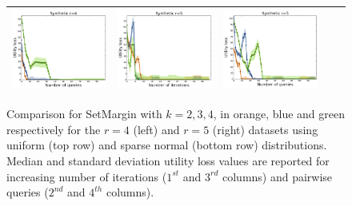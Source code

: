 \documentclass{article}
\renewcommand\[{\begin{equation}}
\renewcommand\]{\end{equation}}
\begin{document}
\begin{figure}[t]
{\begin{tabular}{ccccc}
        \includegraphics[align=c,width=10em]{figures/synthetic_vs_self_4_normal_sparse_per_query_loss} &
        \includegraphics[align=c,width=10em]{figures/synthetic_vs_self_5_normal_sparse_per_iter_loss} &
        \includegraphics[align=c,width=10em]{figures/synthetic_vs_self_5_normal_sparse_per_query_loss}
        \\
        \hline
     \end{tabular}
    }
    \caption{\label{fig:selfcomparison} Comparison for {\sc SetMargin}
      with $k=2,3,4$, in orange, blue and green respectively for the
      $r=4$ (left) and $r=5$ (right) datasets using uniform (top row) and sparse normal (bottom row) distributions. Median and standard deviation utility loss values are reported for increasing number of iterations ($1^{st}$ and $3^{rd}$ columns) and pairwise queries ($2^{nd}$ and $4^{th}$ columns).}
\end{figure}
\end{document}
